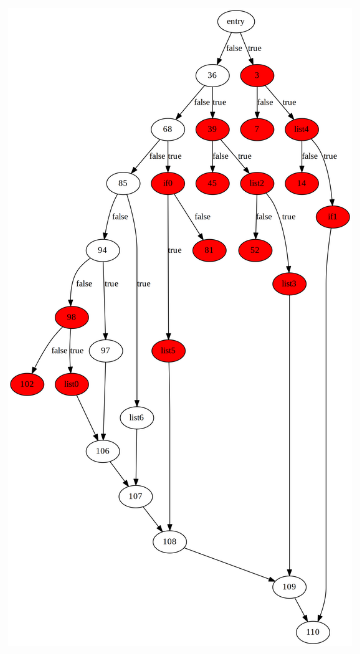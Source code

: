 \begin{figure}[htbp]
	\centering
	\begin{subfigure}[ht]{0.45\textwidth}
		\includegraphics[width=\textwidth]{inc/appendices/control_flow_analysis_example/step4_before.png}
	\end{subfigure}
	\qquad
	\begin{subfigure}[ht]{0.45\textwidth}

\end{subfigure}
\end{figure}
